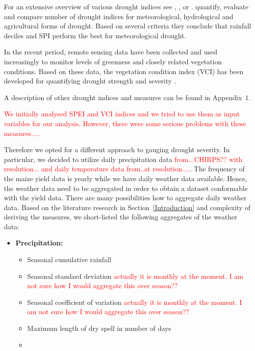 \documentclass[a4paper,12pt]{article}
\begin{document}
For an extensive overview of various drought indices see \cite{Heim2002}, \cite{monacelli2005}, \cite{zargar2011} or \cite{svoboda2016}. \cite{keyantash2002} quantify, evaluate and compare number of drought indices for meteorological, hydrological and agricultural forms of drought. Based on several criteria they conclude that rainfall deciles and SPI perform the best for meteorological drought.

In the recent period, remote sensing data have been collected and used increasingly to monitor levels of greenness and closely related vegetation conditions. Based on these data, the vegetation condition index (VCI) has been developed for quantifying drought strength and severity \citep{KlischAtz2016}.

A description of other drought indices and measures can be found in Appendix~$1$.

\textcolor{red}{We initially analysed SPEI and VCI indices and we tried to use them as input variables for our analysis. However, there were some serious problems with these measures.....}

Therefore we opted for a different approach to gauging drought severity. In particular, we decided to utilize daily precipitation data \textcolor{red}{from...CHIRPS?? with resolution... and daily temperature data from..at resolution....}. The frequency  of the maize yield data is yearly while we have daily weather data available. Hence, the weather data need to be aggregated in order to obtain a dataset conformable with the yield data. There are many possibilities how to aggregate daily weather data. Based on the literature research in Section~\ref{Introduction} and complexity of deriving the measures, we short-listed the following aggregates of the weather data:

\begin{itemize}

\item \textbf{Precipitation:}

\begin{itemize}
\item Seasonal cumulative rainfall
\item Seasonal standard deviation \textcolor{red}{actually it is monthly at the moment. I am not sure how I would aggregate this over season??}
\item Seasonal coefficient of variation \textcolor{red}{actually it is monthly at the moment. I am not sure how I would aggregate this over season??}
\item Maximum length of dry spell in number of days
\item 
\end{itemize}
\end{itemize}
\end{document}
